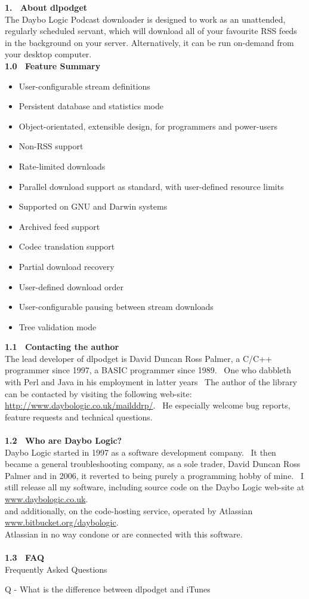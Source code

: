 \documentclass{article}
\begin{document}
\newpage
\textbf{1.~ About dlpodget}
\\
The Daybo Logic Podcast downloader is designed to work as an unattended, regularly scheduled servant, which
will download all of your favourite RSS feeds in the background on your server.  Alternatively, it can be run
on-demand from your desktop computer.
\\
\textbf{1.0~ Feature Summary}
\begin{itemize}
\item User-configurable stream definitions
\item Persistent database and statistics mode
\item Object-orientated, extensible design, for programmers and power-users
\item Non-RSS support
\item Rate-limited downloads
\item Parallel download support as standard, with user-defined resource limits
\item Supported on GNU and Darwin systems
\item Archived feed support
\item Codec translation support
\item Partial download recovery
\item User-defined download order
\item User-configurable pausing between stream downloads
\item Tree validation mode
\end{itemize}
\textbf{1.1~ Contacting the author}
\\
The lead developer of dlpodget is David Duncan Ross Palmer, a C/C++
programmer since 1997, a BASIC programmer since 1989.  ~One who dabbleth with Perl and Java in his employment in latter years~
The author of the library can be contacted by visiting
the following web-site: \href{http://www.daybologic.co.uk/mailddrp/}{\url{http://www.daybologic.co.uk/mailddrp/}}.~
He especially welcome bug reports, feature requests and technical
questions.\\
\\
\textbf{1.2~ Who are Daybo Logic?}
\\
Daybo Logic started in 1997 as a software development company.~ It
then became a general troubleshooting company, as a sole trader, David
Duncan Ross Palmer and in 2006, it reverted to being purely a
programming hobby of mine.~ I still release all my software,
including source code on the Daybo Logic web-site at \href{http://www.daybologic.co.uk/}{www.daybologic.co.uk}.\\
and additionally, on the code-hosting service, operated by Atlassian
\href{https://bitbucket.org/daybologic}{www.bitbucket.org/daybologic}.\\
Atlassian in no way condone or are connected with this software.\\
\\
\textbf{1.3~ FAQ}
\\
Frequently Asked Questions
\\
\par Q - What is the difference between dlpodget and iTunes
\end{document}
